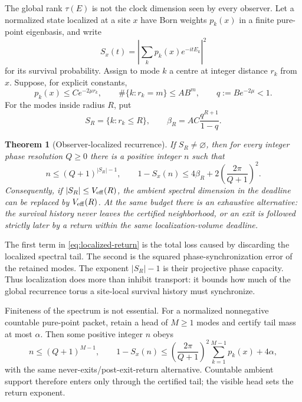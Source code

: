 \documentclass[10pt]{article}
\newtheorem{theorem}{Theorem}
\theoremstyle{definition}
\begin{document}
The global rank \(\tau(E)\) is not the clock dimension seen by every
observer. Let a normalized state localized at a site \(x\) have Born
weights \(p_k(x)\) in a finite pure-point eigenbasis, and write
\[
 S_x(t)=
 \left|\sum_k p_k(x)e^{-itE_k}\right|^2
\]
for its survival probability. Assign to mode \(k\) a centre at integer
distance \(r_k\) from \(x\). Suppose, for explicit constants,
\begin{equation}
 p_k(x)\le C e^{-2\mu r_k},\qquad
 \#\{k:r_k=m\}\le AB^m,\qquad
 q:=Be^{-2\mu}<1 .
 \label{eq:localizationcertificate}
\end{equation}
For the modes inside radius \(R\), put
\[
 S_R=\{k:r_k\le R\},\qquad
 \beta_R=AC\frac{q^{R+1}}{1-q}.
\]

\begin{theorem}[Observer-localized recurrence]
\label{thm:observer-localized-recurrence}
If \(S_R\ne\varnothing\), then for every integer phase resolution
\(Q\ge0\) there is a positive integer \(n\) such that
\begin{equation}
 n\le(Q+1)^{|S_R|-1},\qquad
 1-S_x(n)\le
 4\beta_R+
 2\left(\frac{2\pi}{Q+1}\right)^2 .
 \label{eq:localized-return}
\end{equation}
Consequently, if \(|S_R|\le V_{\rm eff}(R)\), the ambient spectral
dimension in the deadline can be replaced by \(V_{\rm eff}(R)\). At the
same budget there is an exhaustive alternative: the survival history never
leaves the certified neighborhood, or an exit is followed strictly later
by a return within the same localization-volume deadline.
\end{theorem}

The first term in \eqref{eq:localized-return} is the total loss caused by
discarding the localized spectral tail. The second is the squared
phase-synchronization error of the retained modes. The exponent
\(|S_R|-1\) is their projective phase capacity. Thus localization does
more than inhibit transport: it bounds how much of the global recurrence
torus a site-local survival history must synchronize.

Finiteness of the spectrum is not essential. For a normalized nonnegative
countable pure-point packet, retain a head of \(M\ge1\) modes and certify
tail mass at most \(\alpha\). Then some positive integer \(n\) obeys
\begin{equation}
 n\le(Q+1)^{M-1},\qquad
 1-S_x(n)\le
 \left(\frac{2\pi}{Q+1}\right)^2
 \sum_{k=1}^{M-1}p_k(x)+4\alpha ,
 \label{eq:countable-localized-return}
\end{equation}
with the same never-exits/post-exit-return alternative. Countable ambient
support therefore enters only through the certified tail; the visible head
sets the return exponent.
\end{document}
